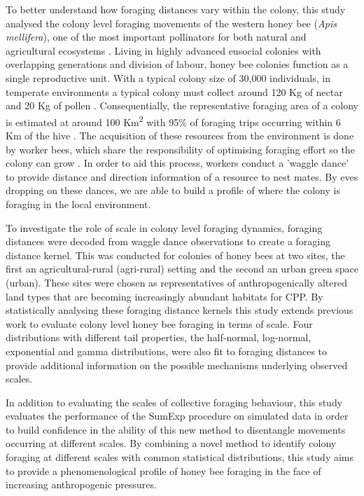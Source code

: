\documentclass[11pt,usenames,dvipsnames]{article}
\begin{document}
\begin{linenumbers}
To better understand how foraging distances vary within the colony, this study analysed the colony level foraging movements of the western honey bee (\textit{Apis mellifera}), one of the most important pollinators for both natural and agricultural ecosystems \citep{Albrecht2018}. Living in highly advanced eusocial colonies with overlapping generations and division of labour, honey bee colonies function as a single reproductive unit. With a typical colony size of 30,000 individuals, in temperate environments a typical colony must collect around 120 Kg of nectar and 20 Kg of pollen \citep{Seeley1995}. Consequentially, the representative foraging area of a colony is estimated at around 100 Km\textsuperscript{2} with 95\% of foraging trips occurring within 6 Km of the hive \citep{Samuelson2017}. The acquisition of these resources from the environment is done by worker bees, which share the responsibility of optimising foraging effort so the colony can grow \citep{Samuelson2017}. In order to aid this process, workers conduct a 'waggle dance' to provide distance and direction information of a resource to nest mates. By eves dropping on these dances, we are able to build a profile of where the colony is foraging in the local environment.

To investigate the role of scale in colony level foraging dynamics, foraging distances were decoded from waggle dance observations to create a foraging distance kernel. This was conducted for colonies of honey bees at two sites, the first an agricultural-rural (agri-rural) setting and the second an urban green space (urban). These sites were chosen as representatives of anthropogenically altered land types that are becoming increasingly abundant habitats for CPP. By statistically analysing these foraging distance kernels this study extends previous work to evaluate colony level honey bee foraging in terms of scale. Four distributions with different tail properties, the half-normal, log-normal, exponential and gamma distributions, were also fit to foraging distances to provide additional information on the possible mechanisms underlying observed scales.

In addition to evaluating the scales of collective foraging behaviour, this study evaluates the performance of the SumExp procedure on simulated data in order to build confidence in the ability of this new method to disentangle movements occurring at different scales. By combining a novel method to identify colony foraging at different scales with common statistical distributions, this study aims to provide a phenomenological profile of honey bee foraging in the face of increasing anthropogenic pressures.
\end{linenumbers}
	
\end{document}
